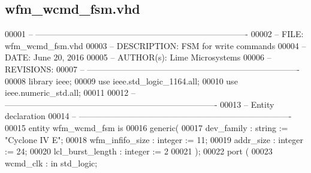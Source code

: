 \subsection{wfm\+\_\+wcmd\+\_\+fsm.\+vhd}
\label{wfm__wcmd__fsm_8vhd_source}

\begin{DoxyCode}
00001 \textcolor{keyword}{-- ---------------------------------------------------------------------------- }
00002 \textcolor{keyword}{-- FILE:    wfm\_wcmd\_fsm.vhd}
00003 \textcolor{keyword}{-- DESCRIPTION: FSM for write commands}
00004 \textcolor{keyword}{-- DATE:    June 20, 2016}
00005 \textcolor{keyword}{-- AUTHOR(s):   Lime Microsystems}
00006 \textcolor{keyword}{-- REVISIONS:}
00007 \textcolor{keyword}{-- ---------------------------------------------------------------------------- }
00008 \textcolor{vhdlkeyword}{library }\textcolor{keywordflow}{ieee};
00009 \textcolor{vhdlkeyword}{use }ieee.std\_logic\_1164.\textcolor{keywordflow}{all};
00010 \textcolor{vhdlkeyword}{use }ieee.numeric\_std.\textcolor{keywordflow}{all};
00011 
00012 \textcolor{keyword}{-- ----------------------------------------------------------------------------}
00013 \textcolor{keyword}{-- Entity declaration}
00014 \textcolor{keyword}{-- ----------------------------------------------------------------------------}
00015 \textcolor{keywordflow}{entity }wfm_wcmd_fsm \textcolor{keywordflow}{is}
00016     \textcolor{keywordflow}{generic}\textcolor{vhdlchar}{(}
00017             \textcolor{vhdlchar}{dev_family}          \textcolor{vhdlchar}{:} \textcolor{comment}{string}  \textcolor{vhdlchar}{:=} \textcolor{keyword}{"Cyclone IV E"}; 
00018             \textcolor{vhdlchar}{wfm_infifo_size} \textcolor{vhdlchar}{:} \textcolor{comment}{integer} \textcolor{vhdlchar}{:=} \textcolor{vhdllogic}{}\textcolor{vhdllogic}{11};
00019             \textcolor{vhdlchar}{addr_size}           \textcolor{vhdlchar}{:} \textcolor{comment}{integer} \textcolor{vhdlchar}{:=} \textcolor{vhdllogic}{}\textcolor{vhdllogic}{24};
00020             \textcolor{vhdlchar}{lcl_burst_length}    \textcolor{vhdlchar}{:} \textcolor{comment}{integer} \textcolor{vhdlchar}{:=} \textcolor{vhdllogic}{}\textcolor{vhdllogic}{2}
00021 \textcolor{vhdlchar}{)};
00022     \textcolor{keywordflow}{port} \textcolor{vhdlchar}{(}
00023         \textcolor{vhdlchar}{wcmd_clk}                    \textcolor{vhdlchar}{:} \textcolor{keywordflow}{in} \textcolor{comment}{std\_logic};

\end{DoxyCode}
